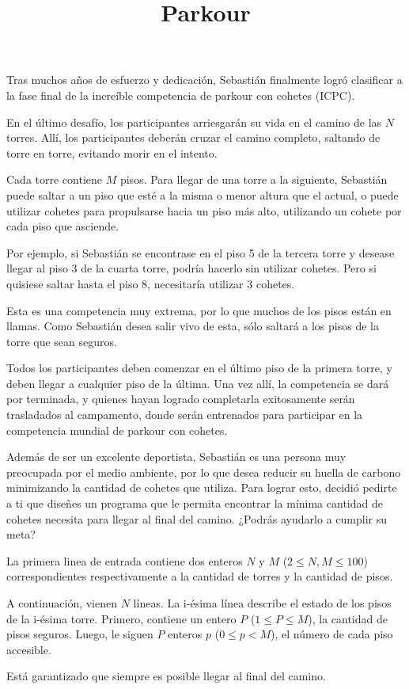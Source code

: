\documentclass{oci}
\title{Parkour}
\begin{document}
\begin{problemDescription}
  Tras muchos años de esfuerzo y dedicación, Sebastián finalmente logró clasificar a la fase final de la increíble competencia de parkour con cohetes (ICPC).

  En el último desafío, los participantes arriesgarán su vida en el camino de las $N$ torres. Allí, los participantes deberán cruzar el camino completo, saltando de torre en torre, evitando morir en el intento.

  Cada torre contiene $M$ pisos. Para llegar de una torre a la siguiente, Sebastián puede saltar a un piso que esté a la misma o menor altura que el actual, o puede utilizar cohetes para propulsarse hacia un piso más alto, utilizando un cohete por cada piso que asciende.

  Por ejemplo, si Sebastián se encontrase en el piso 5 de la tercera torre y desease llegar al piso 3 de la cuarta torre, podría hacerlo sin utilizar cohetes. Pero si quisiese saltar hasta el piso 8, necesitaría utilizar 3 cohetes.

  Esta es una competencia muy extrema, por lo que muchos de los pisos están en llamas. Como Sebastián desea salir vivo de esta, sólo saltará a los pisos de la torre que sean seguros.

  Todos los participantes deben comenzar en el último piso de la primera torre, y deben llegar a cualquier piso de la última. Una vez allí, la competencia se dará por terminada, y quienes hayan logrado completarla exitosamente serán trasladados al campamento, donde serán entrenados para participar en la competencia mundial de parkour con cohetes.

  Además de ser un excelente deportista, Sebastián es una persona muy preocupada por el medio ambiente, por lo que desea reducir su huella de carbono minimizando la cantidad de cohetes que utiliza. Para lograr esto, decidió pedirte a ti que diseñes un programa que le permita encontrar la mínima cantidad de cohetes necesita para llegar al final del camino. ¿Podrás ayudarlo a cumplir su meta?

\end{problemDescription}

\begin{inputDescription}
  La primera linea de entrada contiene dos enteros $N$ y $M$ ($2 \leq N, M \leq 100$) correspondientes respectivamente a la cantidad de torres y la cantidad de pisos.

  A continuación, vienen $N$ líneas. La i-ésima línea describe el estado de los pisos de la i-ésima torre. Primero, contiene un entero $P$ ($1 \leq P \leq M$), la cantidad de pisos seguros. Luego, le siguen $P$ enteros $p$ ($0 \leq p < M$), el número de cada piso accesible.

  Está garantizado que siempre es posible llegar al final del camino.
\end{inputDescription}
\end{document}
